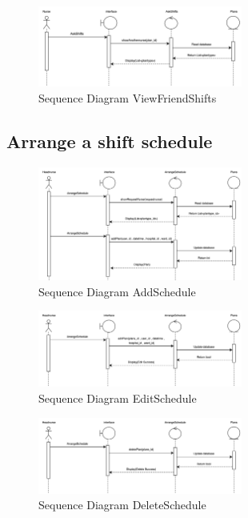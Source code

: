     \begin{figure}[h]
    \centering
    \includegraphics[width=0.6\textwidth]{Sequence 2.4.png}
    \caption{Sequence Diagram ViewFriendShifts}
    \end{figure}


\subsection{Arrange a shift schedule}

    \begin{figure}[h]
    \centering
    \includegraphics[width=0.6\textwidth]{Sequence 3.1.png}
    \caption{Sequence Diagram AddSchedule}
    \end{figure}

    \begin{figure}[h]
    \centering
    \includegraphics[width=0.6\textwidth]{Sequence 3.2.png}
    \caption{Sequence Diagram EditSchedule}
    \end{figure}

    \begin{figure}[h]
    \centering
    \includegraphics[width=0.6\textwidth]{Sequence 3.3.png}
    \caption{Sequence Diagram DeleteSchedule}
    \end{figure}

